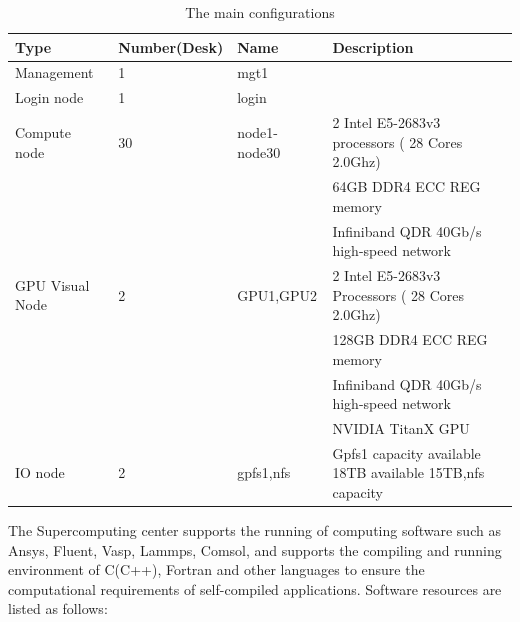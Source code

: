 \documentclass[a4paper,12pt]{article}
\begin{document}
\begin{table}[H]
\centering
\caption{The main configurations}
\begin{tabular}{|l|l|l|l|}
\hline
Type & Number(Desk) & Name & Description \\
\hline
Management & 1 & mgt1 &  \\
\hline
Login node & 1 & login &  \\
\hline
Compute node & 30 & node1-node30 & 2 Intel E5-2683v3 processors ( 28 Cores 2.0Ghz) \\
 &  &  & 64GB DDR4 ECC REG memory \\
 &  &  & Infiniband QDR 40Gb/s high-speed network \\
\hline
GPU Visual Node & 2 & GPU1,GPU2 & 2 Intel E5-2683v3 Processors ( 28 Cores 2.0Ghz) \\
 &  &  & 128GB DDR4 ECC REG memory \\
 &  &  & Infiniband QDR 40Gb/s high-speed network \\
 &  &  & NVIDIA TitanX GPU \\
\hline
IO node & 2 & gpfs1,nfs & Gpfs1 capacity available 18TB available 15TB,nfs capacity \\
\hline
\end{tabular}
\end{table}

The Supercomputing center supports the running of computing software such as Ansys, Fluent, Vasp, Lammps, Comsol, and supports the compiling and running environment of C(C++), Fortran and other languages to ensure the computational requirements of self-compiled applications. Software resources are listed as follows:
\end{document}
